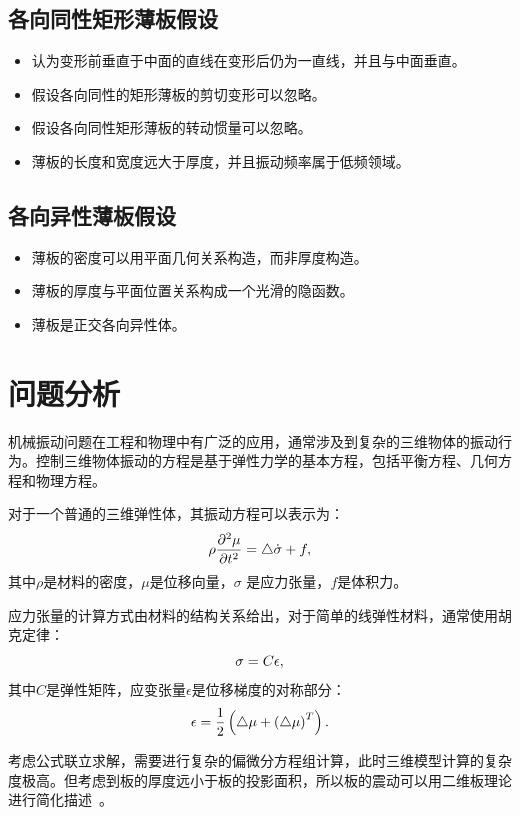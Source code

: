\documentclass[withoutpreface,bwprint]{cumcmthesis} %
\begin{document}
\subsection{各向同性矩形薄板假设}
\begin{itemize}
    \item 认为变形前垂直于中面的直线在变形后仍为一直线，并且与中面垂直。
    \item 假设各向同性的矩形薄板的剪切变形可以忽略。
    \item 假设各向同性矩形薄板的转动惯量可以忽略。
    \item 薄板的长度和宽度远大于厚度，并且振动频率属于低频领域。
\end{itemize}
\subsection{各向异性薄板假设}
\begin{itemize}
\item 薄板的密度可以用平面几何关系构造，而非厚度构造。
\item 薄板的厚度与平面位置关系构成一个光滑的隐函数。
\item 薄板是正交各向异性体。
\end{itemize}
\section{问题分析}
机械振动问题在工程和物理中有广泛的应用，通常涉及到复杂的三维物体的振动行为。控制三维物体振动的方程是基于弹性力学的基本方程，包括平衡方程、几何方程和物理方程。

对于一个普通的三维弹性体，其振动方程可以表示为：
\begin{equation}
\rho\frac{\partial^2\mu}{\partial t^2}=\bigtriangleup\dot\sigma+f, \notag
\end{equation}
其中$\rho$是材料的密度，$\mu$是位移向量，$\sigma$
是应力张量，$f$是体积力。

应力张量的计算方式由材料的结构关系给出，对于简单的线弹性材料，通常使用胡克定律：
\begin{equation}
    \sigma=C\epsilon, \notag
\end{equation}
其中$C$是弹性矩阵，应变张量$\epsilon$是位移梯度的对称部分：
\begin{equation}
    \epsilon=\frac{1}{2}\left(\bigtriangleup\mu+\left(\bigtriangleup\mu\right)^T\right). \notag
\end{equation}

考虑公式联立求解，需要进行复杂的偏微分方程组计算，此时三维模型计算的复杂度极高。但考虑到板的厚度远小于板的投影面积，所以板的震动可以用二维板理论进行简化描述~\cite{ref2}\cite{ref6}。
\end{document}

